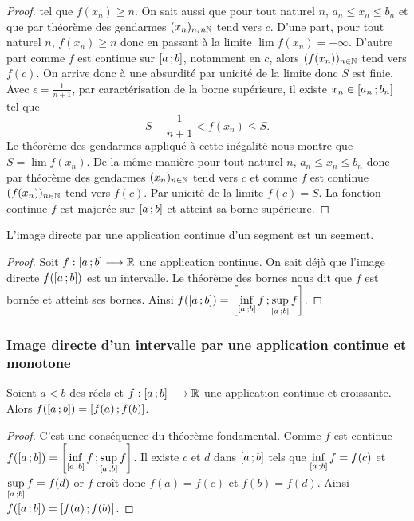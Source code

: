 \begin{proof}
  \) tel que \(f(x_n) \geqslant n\). On sait aussi que 
  pour tout naturel \(n\), \(a_n \leqslant x_n \leqslant b_n\) et que par 
  théorème des gendarmes \((x_n)_{n _in \mathbb{N}}\) tend vers \(c\). D'une part, pour 
  tout naturel \(n\), \(f(x_n) \geqslant n\) donc en passant à la limite \(\lim 
  f(x_n) = +\infty\). D'autre part comme \(f\) est continue sur 
  \(\left[ a \, ;  b \right]\), notamment en \(c\), alors \((f(x_n))_{n\in \mathbb{N}}\) tend 
  vers \(f(c)\). On arrive donc à une absurdité par unicité de la limite donc 
  \(S\) est finie. Avec \(\epsilon=\frac{1}{n+1}\), par caractérisation de la 
  borne supérieure, il existe \(x_n \in \left[ a_n \, ;  b_n \right]\) tel que
  \begin{equation}
    S-\frac{1}{n+1} < f(x_n) \leqslant S.
  \end{equation}
  Le théorème des gendarmes appliqué à cette inégalité nous montre que \(S=\lim 
  f(x_n)\). De la même manière pour tout naturel \(n\), \(a_n \leqslant x_n 
  \leqslant b_n\) donc par théorème des gendarmes \((x_n)_{n\in \mathbb{N}}\) tend vers 
  \(c\) et comme \(f\) est continue \((f(x_n))_{n\in \mathbb{N}}\) tend vers \(f(c)\). 
  Par unicité de la limite \(f(c)=S\). La fonction continue \(f\) est majorée 
  sur \(\left[ a \, ;  b \right]\) et atteint sa borne supérieure.
\end{proof}

\begin{theo}
  L'image directe par une application continue d'un segment est un segment.
\end{theo}
\begin{proof}
  Soit \(f:\left[ a \, ;  b \right] \longrightarrow \mathbb{R}\) une application continue. On 
  sait déjà que l'image directe \(f(\left[ a \, ;  b \right])\) est un intervalle. Le 
  théorème des bornes nous dit que \(f\) est bornée et atteint ses bornes. Ainsi 
  \(f(\left[ a \, ;  b \right])=\left[ \inf\limits_{\left[ a \, ;  b \right]}f \, ;  \sup\limits_{\left[ a \, ;  b \right]}f \right]\).
\end{proof}

\subsubsection[Image directe d'un intervalle]{Image directe d'un intervalle par 
une application continue et monotone}

\begin{theo} \label{theo:imagesegment}
  Soient \(a<b\) des réels et \(f:\left[ a \, ;  b \right] \longrightarrow \mathbb{R}\) une 
  application continue et croissante. Alors 
  \(f(\left[ a \, ;  b \right])=\left[ f(a) \, ;  f(b) \right]\).
\end{theo}
\begin{proof}
  C'est une conséquence du théorème fondamental. Comme \(f\) est continue 
  \(f(\left[ a \, ;  b \right])=\left[ \inf\limits_{\left[ a \, ;  b \right]}f \, ;  \sup\limits_{\left[ a \, ;  b \right]}f \right]\). 
  Il existe \(c\) et \(d\) dans \(\left[ a \, ;  b \right]\) tels que 
  \(\inf\limits_{\left[ a \, ;  b \right]}f=f(c)\) et 
  \(\sup\limits_{\left[ a \, ;  b \right]}f=f(d)\) or \(f\) croît donc \(f(a)=f(c)\) 
  et \(f(b)=f(d)\). Ainsi \(f(\left[ a \, ;  b \right])=\left[ f(a) \, ;  f(b) \right]\).
\end{proof}

